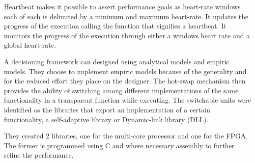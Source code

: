 Heartbeat makes it possible to assert performance goals as heart-rate windows each of each is delimited by a minimum and maximum heart-rate. It updates the progress of the execution calling the function that signifies a heartbeat. It monitors the progress of the execution through either a windows heart rate and a global heart-rate.

A decisioning framework can designed using analytical models and empiric models. They choose to implement empiric models because of the generality and for the reduced effort they place on the designer. The hot-swap mechanism then provides the ability of switching among different implementations of the same functionality in a transparent function while executing.  The switchable units were identified as the libraries that export an implementation of a certain functionality, a self-adaptive library or Dynamic-link library (DLL).

They created 2 libraries, one for the multi-core processor and one for the FPGA. The former is programmed using C and where necessary assembly to further refine the performance.

